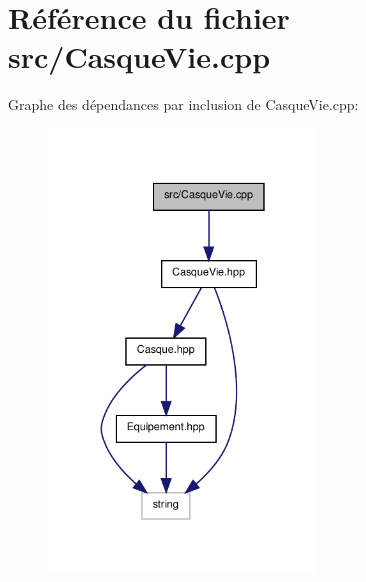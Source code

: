 \section{Référence du fichier src/\-Casque\-Vie.cpp}
\label{_casque_vie_8cpp}
Graphe des dépendances par inclusion de Casque\-Vie.\-cpp\-:\nopagebreak
\begin{figure}[H]
\begin{center}
\leavevmode
\includegraphics[width=202pt]{_casque_vie_8cpp__incl}
\end{center}
\end{figure}
